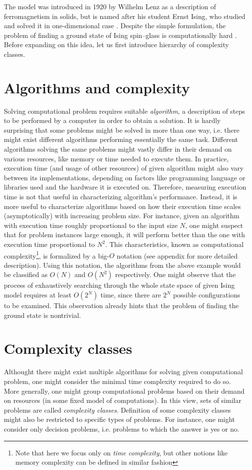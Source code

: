 The model was introduced in 1920 by Wilhelm Lenz \cite{lenz} as a description of ferromagnetism in solids, but is named after his student Ernst Ising, who studied and solved it in one-dimensional case \cite{ising}.  Despite the simple formulation, the problem of finding a ground state of Ising spin--glass is computationally hard \cite{barahoma}. Before expanding on this idea, let us first introduce hierarchy of complexity classes.

\section{Algorithms and complexity}
Solving computational problem requires suitable \emph{algorithm}, a description of steps to be performed by a computer in order to obtain a solution. It is hardly surprising that some problems might be solved in more than one way, i.e. there might exist different algorithms performing essentially the same task. Different algorithms solving the same problems might vastly differ in their demand on various resources, like memory or time needed to execute them. In practice, execution time (and usage of other resources) of given algorithm might also vary between its implementations, depending on factors like programming language or libraries used and the hardware it is executed on. Therefore, measuring execution time is not that useful in characterizing algorithm's performance.  Instead, it is more useful to characterize algorithms based on how their execution time scales (asymptotically) with increasing problem size. For instance, given an algorithm with execution time roughly proportional to the input size $N$, one might suspect that for problem instances large enough, it will perform better than the one with execution time proportional to $N^{2}$. This characteristics, known as computational complexity\footnote{Note that here we focus only on \emph{time complexity}, but other notions like memory complexity can be defined in similar fashion}, is formalized by a big-$O$ notation (see appendix for more detailed description). Using this notation, the algorithms from the above example would be classified as $O(N)$ and $O(N^{2})$ respectively. One might observe that the process of exhaustively searching through the whole state space of given Ising model requires at least $O(2^{N})$ time, since there are $2^{N}$ possible configurations to be examined. This observation already hints that the problem of finding the ground state is nontrivial.

\section{Complexity classes}
Althought there might exist multiple algorithms for solving given computational problem, one might consider the minimal time complexity required to do so. More generally, one might group computational problems based on their demand on resources (in some fixed model of computations). In this view, sets of similar problems are called \emph{complexity classes}. Definition of some complexity classes might also be restricted to specific types of problems. For instance, one might consider only decision problems, i.e. problems to which the answer is yes or no.

